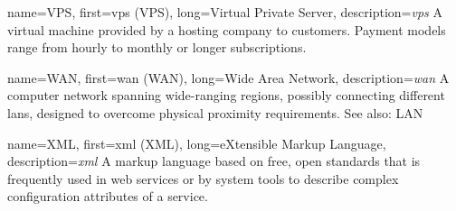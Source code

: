 {
	name={VPS},
	first={\acrlong{vps} (VPS)},
	long={Virtual Private Server},
	description={{\em \acrlong{vps}} A virtual machine provided by a
hosting company to customers.  Payment models range from hourly to monthly
or longer subscriptions.}
}

{
	name={WAN},
	first={\acrlong{wan} (WAN)},
	long={Wide Area Network},
	description={{\em \acrlong{wan}} A computer
network spanning wide-ranging regions, possibly
connecting different \acrlong{lan}s, designed to
overcome physical proximity requirements. See also: LAN}
}

{
	name={XML},
	first={\acrlong{xml} (XML)},
	long={eXtensible Markup Language},
	description={{\em \acrlong{xml}} A markup
language based on free, open standards that is frequently
used in web services or by system tools to
describe complex configuration attributes of a
service.}
}
